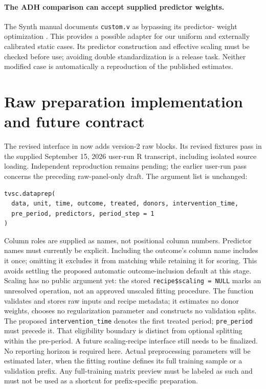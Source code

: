\documentclass[11pt]{article}
\begin{document}
\paragraph{The ADH comparison can accept supplied predictor weights.}
The Synth manual documents \texttt{custom.v} as bypassing its predictor-
weight optimization \cite{synth}. This provides a possible adapter for
our uniform and externally calibrated static cases. Its predictor
construction and effective scaling must be checked before use; avoiding
double standardization is a release task. Neither modified case is
automatically a reproduction of the published estimates.

\section{Raw preparation implementation and future contract}\label{sec:prep}
The revised interface in  now adds version-2
raw blocks. Its revised fixtures pass in the supplied September 15, 2026
user-run R transcript, including isolated source loading. Independent
reproduction remains pending; the earlier user-run pass concerns the
preceding raw-panel-only draft. The argument list is
unchanged:
\begin{verbatim}
tvsc.dataprep(
  data, unit, time, outcome, treated, donors, intervention_time,
  pre_period, predictors, period_step = 1
)
\end{verbatim}
Column roles are supplied as names, not positional column numbers.
Predictor names must currently be explicit. Including the outcome's column
name includes it once; omitting it excludes it from matching while retaining
it for scoring. This avoids settling the proposed automatic outcome-inclusion
default at this stage. Scaling has no public argument yet: the stored
\texttt{recipe\$scaling = NULL} marks an unresolved operation, not an
approved unscaled fitting procedure.
The function validates and stores raw inputs and recipe metadata;
it estimates no donor weights, chooses no regularization parameter and
constructs no validation splits. The proposed \texttt{intervention\_time}
denotes the first treated period; \texttt{pre\_period} must precede it.
That eligibility boundary is distinct from optional splitting within the
pre-period. A future scaling-recipe interface still needs to be finalized.
No reporting horizon is required here. Actual preprocessing parameters
will be estimated later, when the fitting routine defines its full training
sample or a validation prefix.
Any full-training matrix preview must be labeled as such and must not be
used as a shortcut for prefix-specific preparation.
\end{document}
